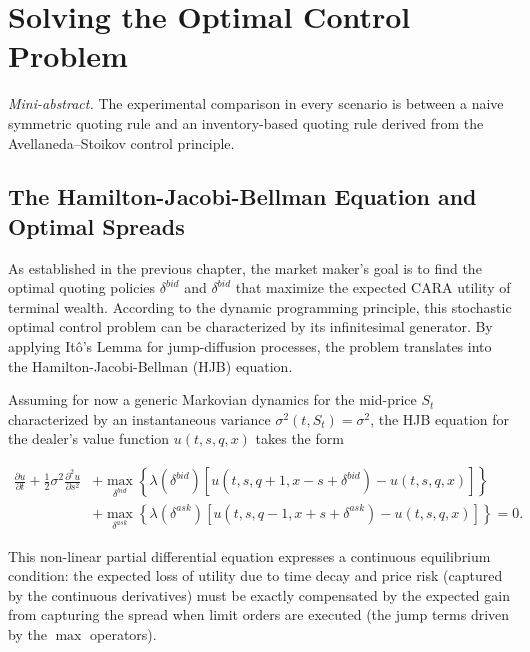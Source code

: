 \documentclass[a4paper,10pt,titlepage,oneside,openany]{book}
\theoremstyle{plain}\newtheorem{theorem}{Theorem}[chapter]
\theoremstyle{definition}\newtheorem{definition}{Definition}[chapter]
\theoremstyle{remark}\newtheorem{remark}{Remark}[chapter]
\newcommand{\miniabstract}[1]{%
\vspace{-2pt}
\begin{tcolorbox}[colback=gray!6,colframe=black!15,boxrule=0.3pt,arc=3pt,left=6pt,right=6pt,top=4pt,bottom=4pt]
\textit{Mini-abstract.} #1
\end{tcolorbox}
\vspace{-4pt}
}
\begin{document}
\chapter{Solving the Optimal Control Problem}
\miniabstract{The experimental comparison in every scenario is between a naive symmetric quoting rule and an inventory-based quoting rule derived from the Avellaneda--Stoikov control principle.}

\section{The Hamilton-Jacobi-Bellman Equation and Optimal Spreads}
As established in the previous chapter, the market maker's goal is to find the optimal quoting policies $\delta^{bid}$ and $\delta^{bid}$ that maximize the expected CARA utility of terminal wealth. According to the dynamic programming principle, this stochastic optimal control problem can be characterized by its infinitesimal generator. By applying Itô's Lemma for jump-diffusion processes, the problem translates into the Hamilton-Jacobi-Bellman (HJB) equation.

Assuming for now a generic Markovian dynamics for the mid-price $S_t$ characterized by an instantaneous variance $\sigma^2(t,S_t)=\sigma^2$, the HJB equation for the dealer's value function $u(t,s,q,x)$ takes the form

\begin{align*}
    \frac{\partial u}{\partial t} + \frac{1}{2}\sigma^2 \frac{\partial^2 u}{\partial s^2} &+ \max_{\delta^{bid}} \left\{ \lambda(\delta^{bid}) [u(t, s, q+1, x - s + \delta^{bid}) - u(t,s,q,x)] \right\} \\
    &+ \max_{\delta^{ask}} \left\{ \lambda(\delta^{ask}) [u(t, s, q-1, x + s + \delta^{ask}) - u(t,s,q,x)] \right\} = 0.
\end{align*}

This non-linear partial differential equation expresses a continuous equilibrium condition: the expected loss of utility due to time decay and price risk (captured by the continuous derivatives) must be exactly compensated by the expected gain from capturing the spread when limit orders are executed (the jump terms driven by the $\max$ operators). 
\end{document}
